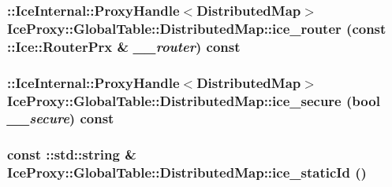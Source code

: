 \label{class_ice_proxy_1_1_global_table_1_1_distributed_map_a17d4cae6d12bf2e32780b75ad44e3bc1}
\hypertarget{class_ice_proxy_1_1_global_table_1_1_distributed_map_a4dab9b037b6677cc7b30ea6738646b43}{
\subsubsection[{ice\_\-router}]{\setlength{\rightskip}{0pt plus 5cm}::IceInternal::ProxyHandle$<${\bf DistributedMap}$>$ IceProxy::GlobalTable::DistributedMap::ice\_\-router (const ::Ice::RouterPrx \& {\em \_\-\_\-router}) const}}
\label{class_ice_proxy_1_1_global_table_1_1_distributed_map_a4dab9b037b6677cc7b30ea6738646b43}
\hypertarget{class_ice_proxy_1_1_global_table_1_1_distributed_map_a9dd665fafcdd19511c2934b661769e87}{
\subsubsection[{ice\_\-secure}]{\setlength{\rightskip}{0pt plus 5cm}::IceInternal::ProxyHandle$<${\bf DistributedMap}$>$ IceProxy::GlobalTable::DistributedMap::ice\_\-secure (bool {\em \_\-\_\-secure}) const}}
\label{class_ice_proxy_1_1_global_table_1_1_distributed_map_a9dd665fafcdd19511c2934b661769e87}
\hypertarget{class_ice_proxy_1_1_global_table_1_1_distributed_map_a1dc837dbc066fbd83a83b2c86fa6b14c}{
\subsubsection[{ice\_\-staticId}]{\setlength{\rightskip}{0pt plus 5cm}const ::std::string \& IceProxy::GlobalTable::DistributedMap::ice\_\-staticId ()}}
